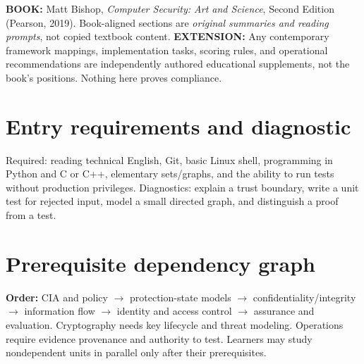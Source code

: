 \documentclass[10pt,letterpaper]{article}
\begin{document}
\makedoctocpage
\begin{notebox}
\textbf{BOOK:} Matt Bishop, \emph{Computer Security: Art and Science}, Second Edition (Pearson, 2019). Book-aligned sections are \emph{original summaries and reading prompts}, not copied textbook content.
\textbf{EXTENSION:} Any contemporary framework mappings, implementation tasks, scoring rules, and operational recommendations are independently authored educational supplements, not the book's positions. Nothing here proves compliance.
\end{notebox}
\section{Entry requirements and diagnostic}
Required: reading technical English, Git, basic Linux shell, programming in Python and C or C++, elementary sets/graphs, and the ability to run tests without production privileges. Diagnostics: explain a trust boundary, write a unit test for rejected input, model a small directed graph, and distinguish a proof from a test.
\section{Prerequisite dependency graph}
\textbf{Order:} CIA and policy $\rightarrow$ protection-state models $\rightarrow$ confidentiality/integrity $\rightarrow$ information flow $\rightarrow$ identity and access control $\rightarrow$ assurance and evaluation. Cryptography needs key lifecycle and threat modeling. Operations require evidence provenance and authority to test. Learners may study nondependent units in parallel only after their prerequisites.
\end{document}
